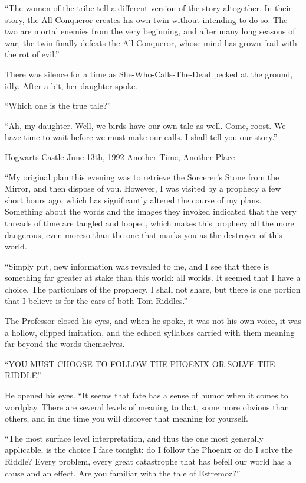 “The women of the tribe tell a different version of the story altogether. In their story, the All-Conqueror creates his own twin without intending to do so. The two are mortal enemies from the very beginning, and after many long seasons of war, the twin finally defeats the All-Conqueror, whose mind has grown frail with the rot of evil.”

There was silence for a time as She-Who-Calls-The-Dead pecked at the ground, idly. After a bit, her daughter spoke.

“Which one is the true tale?”

“Ah, my daughter. Well, we birds have our own tale as well. Come, roost. We have time to wait before we must make our calls. I shall tell you our story.”

Hogwarts Castle
June 13th, 1992
Another Time, Another Place

“My original plan this evening was to retrieve the Sorcerer’s Stone from the Mirror, and then dispose of you. However, I was visited by a prophecy a few short hours ago, which has significantly altered the course of my plans. Something about the words and the images they invoked indicated that the very threads of time are tangled and looped, which makes this prophecy all the more dangerous, even moreso than the one that marks you as the destroyer of this world.

“Simply put, new information was revealed to me, and I see that there is something far greater at stake than this world: all worlds. It seemed that I have a choice. The particulars of the prophecy, I shall not share, but there is one portion that I believe is for the ears of both Tom Riddles.”

The Professor closed his eyes, and when he spoke, it was not his own voice, it was a hollow, clipped imitation, and the echoed syllables carried with them meaning far beyond the words themselves.

“YOU MUST CHOOSE TO FOLLOW THE PHOENIX OR SOLVE THE RIDDLE”

He opened his eyes. “It seems that fate has a sense of humor when it comes to wordplay. There are several levels of meaning to that, some more obvious than others, and in due time you will discover that meaning for yourself.

“The most surface level interpretation, and thus the one most generally applicable, is the choice I face tonight: do I follow the Phoenix or do I solve the Riddle? Every problem, every great catastrophe that has befell our world has a cause and an effect. Are you familiar with the tale of Estremoz?”

